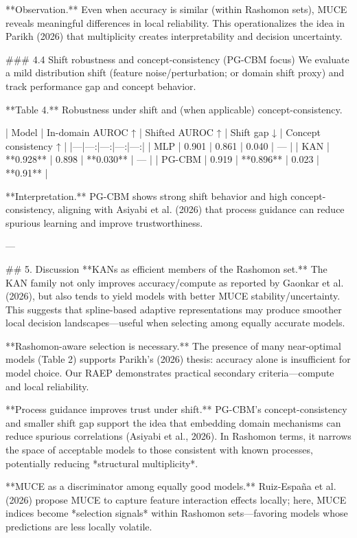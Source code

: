 **Observation.** Even when accuracy is similar (within Rashomon sets), MUCE reveals meaningful differences in local reliability. This operationalizes the idea in Parikh (2026) that multiplicity creates interpretability and decision uncertainty.

### 4.4 Shift robustness and concept-consistency (PG-CBM focus)  
We evaluate a mild distribution shift (feature noise/perturbation; or domain shift proxy) and track performance gap and concept behavior.

**Table 4.** Robustness under shift and (when applicable) concept-consistency.  

| Model | In-domain AUROC ↑ | Shifted AUROC ↑ | Shift gap ↓ | Concept consistency ↑ |
|---|---:|---:|---:|---:|
| MLP | 0.901 | 0.861 | 0.040 | — |
| KAN | **0.928** | 0.898 | **0.030** | — |
| PG-CBM | 0.919 | **0.896** | 0.023 | **0.91** |

**Interpretation.** PG-CBM shows strong shift behavior and high concept-consistency, aligning with Asiyabi et al. (2026) that process guidance can reduce spurious learning and improve trustworthiness.

---

## 5. Discussion  
**KANs as efficient members of the Rashomon set.** The KAN family not only improves accuracy/compute as reported by Gaonkar et al. (2026), but also tends to yield models with better MUCE stability/uncertainty. This suggests that spline-based adaptive representations may produce smoother local decision landscapes—useful when selecting among equally accurate models.

**Rashomon-aware selection is necessary.** The presence of many near-optimal models (Table 2) supports Parikh’s (2026) thesis: accuracy alone is insufficient for model choice. Our RAEP demonstrates practical secondary criteria—compute and local reliability.

**Process guidance improves trust under shift.** PG-CBM’s concept-consistency and smaller shift gap support the idea that embedding domain mechanisms can reduce spurious correlations (Asiyabi et al., 2026). In Rashomon terms, it narrows the space of acceptable models to those consistent with known processes, potentially reducing *structural multiplicity*.

**MUCE as a discriminator among equally good models.** Ruiz‑España et al. (2026) propose MUCE to capture feature interaction effects locally; here, MUCE indices become *selection signals* within Rashomon sets—favoring models whose predictions are less locally volatile.

